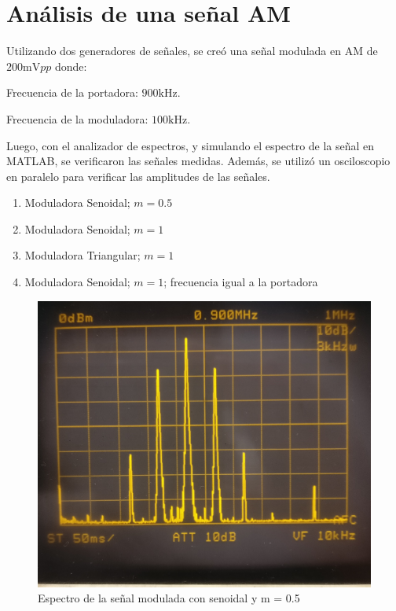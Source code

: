 \chapter{Análisis de una señal AM}
Utilizando dos generadores de señales, se creó una señal
modulada en AM de $200 \si{\milli\volt}pp$ donde:

Frecuencia de la portadora: $900 \si{\kilo\hertz}$.

Frecuencia de la moduladora: $100 \si{\kilo\hertz}$.

Luego, con el analizador de espectros, y simulando el espectro
de la señal en MATLAB, se verificaron las señales medidas. Además, se
utilizó un osciloscopio en paralelo para verificar las amplitudes
de las señales.

\begin{enumerate}
    \item Moduladora Senoidal; $m=0.5$
    \item Moduladora Senoidal; $m=1$
    \item Moduladora Triangular; $m=1$
    \item Moduladora Senoidal; $m=1$; frecuencia igual a la portadora
\end{enumerate}

\begin{figure}[ht]
    \begin{center}
        \includegraphics[width=0.6\linewidth]{contenido/img/espectro_am05.jpg}
        \caption{Espectro de la señal modulada con senoidal y m = 0.5}
        \label{fig:am:05}
    \end{center}
\end{figure}


